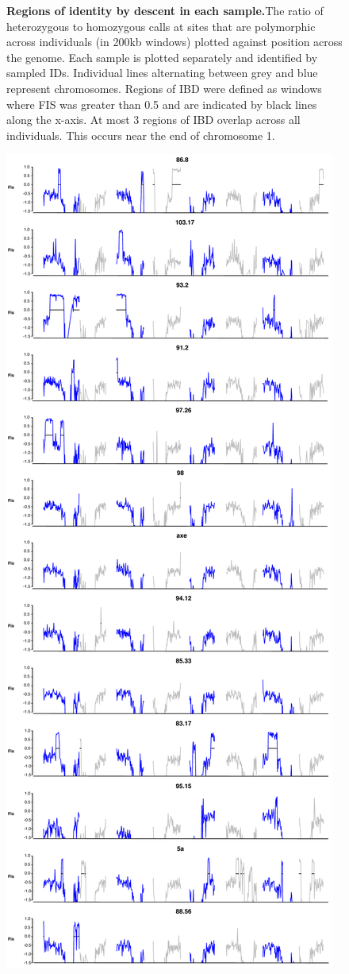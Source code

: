 \begin{figure}[h!]
    \caption{\textbf{Regions of identity by descent in each sample.}The ratio of heterozygous to homozygous calls at sites that are polymorphic across individuals (in 200kb windows) plotted against position across the genome. Each sample is plotted separately and identified by sampled IDs. Individual lines alternating between grey and blue represent chromosomes. Regions of IBD were defined as windows where FIS was greater than 0.5 and are indicated by black lines along the x-axis. At most 3 regions of IBD overlap across all individuals. This occurs near the end of chromosome 1.}
    \label{fig:figS4}
\end{figure}

\begin{figure}[h!]
      \centering
       \includegraphics[scale=0.1]{Ch2FigS5}

\end{figure}
